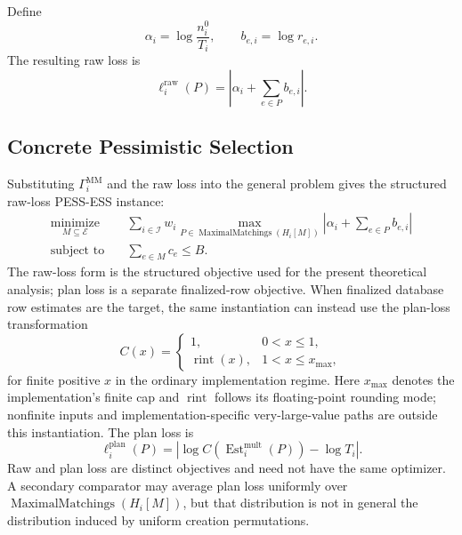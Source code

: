 \documentclass[sigconf, nonacm]{acmart}
\newcommand{\E}{\mathcal{E}}
\begin{document}
Define
\[
  \alpha_i=\log\frac{n_i^0}{T_i},\qquad
  b_{e,i}=\log r_{e,i}.
\]
The resulting raw loss is
\[
  \ell_i^{\mathrm{raw}}(P)=
  \left|\alpha_i+\sum_{e\in P}b_{e,i}\right|.
\]

\subsection{Concrete Pessimistic Selection}

Substituting \(\Gamma_i^{\mathrm{MM}}\) and the raw loss into the general
problem gives the structured raw-loss PESS-ESS instance:
\[
\boxed{\begin{aligned}
  \operatorname*{minimize}_{M\subseteq\E}\quad
    &\sum_{i\in\mathcal I}w_i
      \max_{P\in\operatorname{MaximalMatchings}(H_i[M])}
      \left|\alpha_i+\sum_{e\in P}b_{e,i}\right|\\
  \text{subject to}\quad
    &\sum_{e\in M}c_e\leq B.
\end{aligned}}
\]
The raw-loss form is the structured objective used for the present
theoretical analysis; plan loss is a separate finalized-row objective.
When finalized database row estimates are the target, the same instantiation
can instead use the plan-loss transformation
\[
  C(x)=
  \begin{cases}
    1,&0<x\leq1,\\
    \operatorname{rint}(x),&1<x\leq x_{\max},
  \end{cases}
\]
for finite positive \(x\) in the ordinary implementation regime.  Here
\(x_{\max}\) denotes the implementation's finite cap and
\(\operatorname{rint}\) follows its floating-point rounding mode; nonfinite
inputs and implementation-specific very-large-value paths are outside this
instantiation.  The plan loss is
\[
  \ell_i^{\mathrm{plan}}(P)=
  \left|\log C\!\left(\operatorname{Est}_i^{\mathrm{mult}}(P)\right)
    -\log T_i\right|.
\]
Raw and plan loss are distinct objectives and need not have the same
optimizer.  A secondary comparator may average plan loss uniformly over
\(\operatorname{MaximalMatchings}(H_i[M])\), but that distribution is not in
general the distribution induced by uniform creation permutations.
\end{document}

